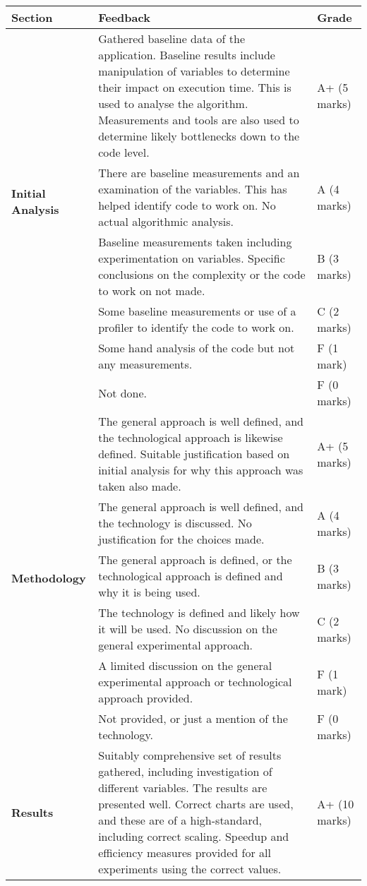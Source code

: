 \documentclass[a4paper, 12pt]{article}
\begin{document}
\begin{table}[H]
	\scriptsize
	\centering
	\begin{tabularx}{\textwidth}{|l|X|l|}
		\hline
		\textbf{Section} & \textbf{Feedback} & \textbf{Grade} \\
		\hline
		\multirow{5}{*}{\textbf{Initial Analysis}} & Gathered baseline data of the application. Baseline results include manipulation of variables to determine their impact on execution time. This is used to analyse the algorithm. Measurements and tools are also used to determine likely bottlenecks down to the code level. & A+ (5 marks) \\
		\cline{2-3}
		& There are baseline measurements and an examination of the variables. This has helped identify code to work on. No actual algorithmic analysis.& A (4 marks) \\
		\cline{2-3}
		& Baseline measurements taken including experimentation on variables.  Specific conclusions on the complexity or the code to work on not made. & B (3 marks) \\
		\cline{2-3}
		& Some baseline measurements or use of a profiler to identify the code to work on. & C (2 marks) \\
		\cline{2-3}
		& Some hand analysis of the code but not any measurements. & F (1 mark) \\
		\cline{2-3}
		& Not done. & F (0 marks) \\
		\hline
		\multirow{6}{*}{\textbf{Methodology}} & The general approach is well defined, and the technological approach is likewise defined. Suitable justification based on initial analysis for why this approach was taken also made. & A+ (5 marks) \\
		\cline{2-3}
		& The general approach is well defined, and the technology is discussed. No	justification for the choices made. & A (4 marks) \\
		\cline{2-3}
		& The general approach is defined, or the technological approach is defined and	why it is being used. & B (3 marks) \\
		\cline{2-3}
		& The technology is defined and likely how it will be used. No discussion on the general experimental approach. & C (2 marks) \\
		\cline{2-3}
		& A limited discussion on the general experimental approach or technological approach provided. & F (1 mark) \\
		\cline{2-3}
		& Not provided, or just a mention of the technology. & F (0 marks) \\
		\hline
		\multirow{6}{*}{\textbf{Results}} & Suitably comprehensive set of results gathered, including investigation of different variables. The results are presented well. Correct charts are used, and these are of a high-standard, including correct scaling. Speedup and efficiency measures provided for all experiments using the correct values. & A+ (10 marks) \\

\end{tabularx}
\end{table}
\end{document}
